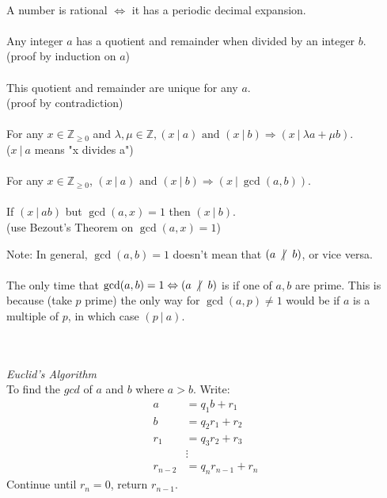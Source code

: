 \documentclass{scrartcl}
\newcommand{\Z}{\mathbb{Z}}
\begin{document}
\noindent
\\
A number is rational $ \Leftrightarrow $ it has a periodic decimal expansion.
\\\\
Any integer $ a $ has a quotient and remainder when divided by an integer $ b $.
\\
(proof by induction on $ a $)
\\\\
This quotient and remainder are unique for any $ a $.
\\
(proof by contradiction)
\\\\
For any $ x \in \Z_{\geq 0} $ and $ \lambda, \mu \in \Z,  (x \ | \ a) \textrm{ and } (x \ | \ b) \Rightarrow (x \ | \  \lambda a + \mu b) $.
\\
($ x \ | \ a  $ means "x divides a")
\\\\
For any $ x \in \Z_{\geq 0} $, $ (x \ | \ a) \textrm{ and } (x \ | \ b) \Rightarrow (x \ | \ \gcd(a, b)) $.
\\\\
If $  (x \ | \ ab) $ but $ \gcd(a, x) = 1 $ then $ (x \ | \ b ) $.
\\
(use Bezout's Theorem on $ \gcd(a, x) = 1 $)
\\
\begin{tcolorbox}[breakable]
Note: In general, $ \gcd(a, b) = 1 $ doesn't mean that $ (a \ \centernot| \ b) $, or vice versa.
\\\\
The only time that $ \gcd(a, b) = 1 \Leftrightarrow (a \ \centernot| \ b) $ is if one of $ a, b $ are prime. This is because (take $ p $ prime) the only way for $ \gcd(a, p) \neq 1 $ would be if $ a $ is a multiple of $ p $, in which case $ (p \ | \ a) $.
\end{tcolorbox}
\noindent
\\\\
\textit{Euclid's Algorithm}
\\
To find the $ gcd $ of $ a $ and $ b $ where $ a > b $. Write:
\begin{align}
a & = q_{1} b + r_{1} \\
b & = q_{2} r_{1} + r_{2} \\
r_{1} & = q_{3} r_{2} + r_{3} \\
& \vdots \\
r_{n-2} & = q_{n} r_{n-1} + r_{n}
\end{align}
Continue until $ r_{n} = 0 $, return $ r_{n-1} $.
\end{document}
